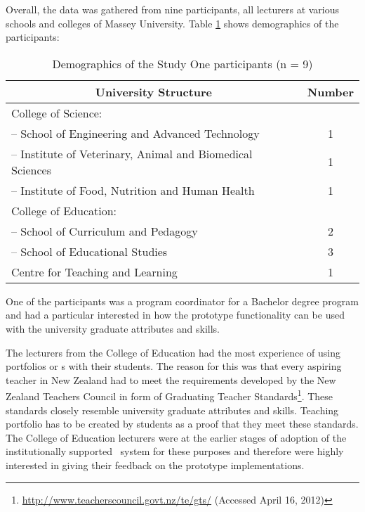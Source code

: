Overall, the data was gathered from nine participants, all lecturers at
various schools and colleges of Massey University. Table \ref{tab:study1part}
shows demographics of the participants:

\begin{table}[htb]
\setlength{\abovecaptionskip}{0pt}
\caption{Demographics of the Study One participants (n = 9)}
  \begin{center}
    \begin{tabular}{| l | c |}
    \hline
     \multicolumn{1}{|c|}{\textbf{University Structure}} &
     \multicolumn{1}{c|}{\textbf{Number}} \\ \hline
		College of Science: & \\ 
		-- School of Engineering and Advanced Technology & 1 \\
		-- Institute of Veterinary, Animal and Biomedical Sciences & 1 \\
		-- Institute of Food, Nutrition and Human Health & 1 \\ \hline
		College of Education: & \\ 
		-- School of Curriculum and Pedagogy & 2 \\
		-- School of Educational Studies &  3 \\ \hline
		Centre for Teaching and Learning & 1 \\ \hline
	\end{tabular}
  \end{center}
\label{tab:study1part}
\end{table}

One of the participants was a program coordinator for a Bachelor degree program
and had a particular interested in how the prototype functionality can be used
with the university graduate attributes and \LLLs skills.

The lecturers from the College of Education had the most experience of using
portfolios or \ep s with their students. The reason for this was that every
aspiring teacher in New Zealand had to meet the requirements developed by the
New Zealand Teachers Council in form of Graduating Teacher
Standards\footnote{\url{http://www.teacherscouncil.govt.nz/te/gts/} (Accessed
April 16, 2012)}. These standards closely resemble university graduate attributes and \LLLs skills.
Teaching portfolio has to be created by students as a proof that they meet these
standards. The College of Education lecturers were at the earlier stages of
adoption of the institutionally supported \ep~system for these purposes and
therefore were highly interested in giving their feedback on the prototype
implementations.

